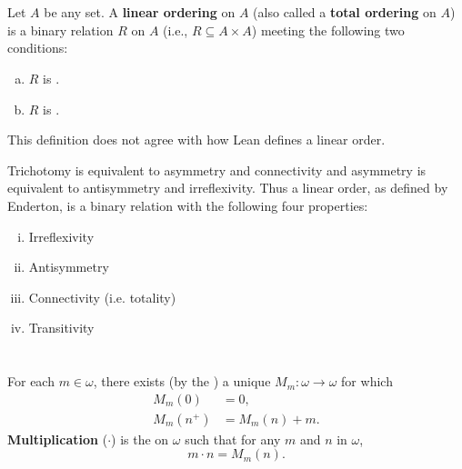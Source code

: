 \documentclass{report}
\begin{document}
\section{}

Let $A$ be any set.
A \textbf{linear ordering} on $A$ (also called a \textbf{total ordering} on $A$)
  is a binary relation $R$ on $A$ (i.e., $R \subseteq A \times A$) meeting the
  following two conditions:

\begin{enumerate}[(a)]
  \item $R$ is .
  \item $R$ is .
\end{enumerate}

\begin{note}
  This definition does not agree with how Lean defines a linear order.

  \vspace{6pt}
  Trichotomy is equivalent to asymmetry and connectivity and asymmetry is
    equivalent to antisymmetry and irreflexivity.
  Thus a linear order, as defined by Enderton, is a binary relation with the
    following four properties:

  \vspace{6pt}
  \begin{enumerate}[(i)]
    \item Irreflexivity
    \item Antisymmetry
    \item Connectivity (i.e. totality)
    \item Transitivity
  \end{enumerate}
\end{note}

\begin{definition}


\end{definition}

\section{}%

For each $m \in \omega$, there exists (by the
  ) a unique
   $M_m \colon \omega \rightarrow \omega$ for which
  \begin{align*}
    M_m(0) & = 0, \\
    M_m(n^+) & = M_m(n) + m.
  \end{align*}
\textbf{Multiplication} ($\cdot$) is the  on
  $\omega$ such that for any $m$ and $n$ in $\omega$, $$m \cdot n = M_m(n).$$
\end{document}
